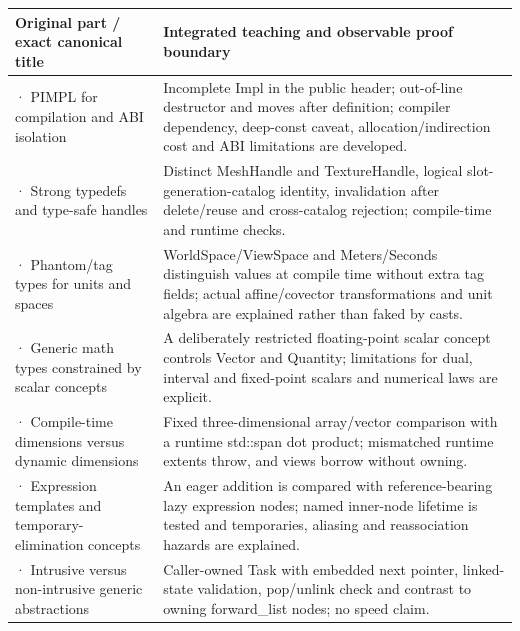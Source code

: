 {\def\LTcaptype{none} %
\begin{longtable}[]{@{}
  >{\raggedright\arraybackslash}p{}
  >{\raggedright\arraybackslash}p{}@{}}
\toprule\noalign{}
\begin{minipage}[b]{\linewidth}\raggedright
Original part / exact canonical title
\end{minipage} & \begin{minipage}[b]{\linewidth}\raggedright
Integrated teaching and observable proof boundary
\end{minipage} \\
\midrule\noalign{}
\endhead
\bottomrule\noalign{}
\endlastfoot
291 · PIMPL for compilation and ABI isolation & Incomplete Impl in the public header; out-of-line destructor and moves after definition; compiler dependency, deep-const caveat, allocation/indirection cost and ABI limitations are developed. \\
292 · Strong typedefs and type-safe handles & Distinct MeshHandle and TextureHandle, logical slot-generation-catalog identity, invalidation after delete/reuse and cross-catalog rejection; compile-time and runtime checks. \\
293 · Phantom/tag types for units and spaces & WorldSpace/ViewSpace and Meters/Seconds distinguish values at compile time without extra tag fields; actual affine/covector transformations and unit algebra are explained rather than faked by casts. \\
294 · Generic math types constrained by scalar concepts & A deliberately restricted floating-point scalar concept controls Vector and Quantity; limitations for dual, interval and fixed-point scalars and numerical laws are explicit. \\
295 · Compile-time dimensions versus dynamic dimensions & Fixed three-dimensional array/vector comparison with a runtime std::span dot product; mismatched runtime extents throw, and views borrow without owning. \\
296 · Expression templates and temporary-elimination concepts & An eager addition is compared with reference-bearing lazy expression nodes; named inner-node lifetime is tested and temporaries, aliasing and reassociation hazards are explained. \\
297 · Intrusive versus non-intrusive generic abstractions & Caller-owned Task with embedded next pointer, linked-state validation, pop/unlink check and contrast to owning forward\_list nodes; no speed claim. \\

\end{longtable}}
